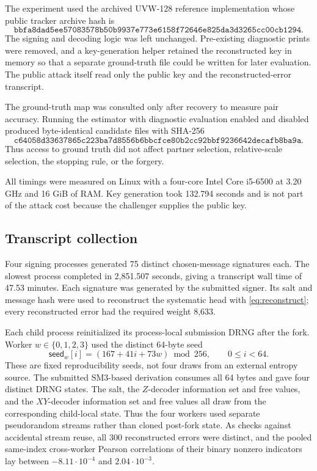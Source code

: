 \documentclass[11pt,a4paper]{article}
\begin{document}
The experiment used the archived UVW-128 reference implementation whose
public tracker archive hash is
\[
\texttt{bbfa8dad5ee57083578b50b9937e773e6158f72646e825da3d3265cc00cb1294}.
\]
The signing and decoding logic was left unchanged.  Pre-existing diagnostic
prints were removed, and a key-generation helper retained the reconstructed
key in memory so that a separate ground-truth file could be written for later
evaluation.  The public attack itself read only the public key and the
reconstructed-error transcript.

The ground-truth map was consulted only after recovery to measure pair
accuracy.
Running the estimator with diagnostic evaluation enabled and disabled
produced byte-identical candidate files with SHA-256
\[
\texttt{c64058d33637865c223ba7d8556b6bbcfce80b2cc92bbf9236642decafb8ba9a}.
\]
Thus access to ground truth did not affect partner selection, relative-scale
selection, the stopping rule, or the forgery.

All timings were measured on Linux with a four-core Intel Core i5-6500 at
3.20 GHz and 16 GiB of RAM.  Key generation took 132.794 seconds and is not
part of the attack cost because the challenger supplies the public key.

\subsection{Transcript collection}

Four signing processes generated 75 distinct chosen-message signatures each.
The slowest process completed in 2,851.507 seconds, giving a transcript wall
time of 47.53 minutes.  Each signature was generated by the submitted signer.  Its salt and
message hash were used to reconstruct the systematic head with
\eqref{eq:reconstruct}; every reconstructed error had the required weight
8,633.

Each child process reinitialized its process-local submission DRNG after the
fork.  Worker $w\in\{0,1,2,3\}$ used the distinct 64-byte seed
\[
       \mathsf{seed}_w[i]=(167+41i+73w)\bmod 256,
       \qquad 0\leq i<64.
\]
These are fixed reproducibility seeds, not four draws from an external
entropy source.
The submitted SM3-based derivation consumes all 64 bytes and gave four
distinct DRNG states.  The salt, the $Z$-decoder information set and free
values, and the $XY$-decoder information set and free values all draw from
the corresponding child-local state.  Thus the four workers used separate pseudorandom streams rather than
cloned post-fork state.  As checks against accidental stream reuse, all 300
reconstructed errors were distinct, and the pooled same-index cross-worker
Pearson correlations of their binary nonzero indicators lay between
$-8.11\mathbin{\cdot}10^{-4}$ and $2.04\mathbin{\cdot}10^{-3}$.
\end{document}
